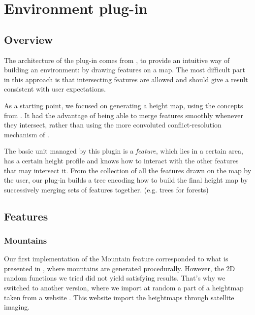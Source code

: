 \section{Environment plug-in}

\subsection{Overview}

The architecture of the plug-in comes from
\cite{DeclarativeArchitecture}, to provide an intuitive way of
building an environment: by drawing features on a map. The most
difficult part in this approach is that intersecting features are
allowed and should give a result consistent with user expectations.

As a starting point, we focused on generating a height map, using the
concepts from \cite{FeatureTree}. It had the advantage of being able
to merge features smoothly whenever they intersect, rather than using
the more convoluted conflict-resolution mechanism of
\cite{DeclarativeArchitecture}.

\bigskip

The basic unit managed by this plugin is a \emph{feature}, which lies
in a certain area, has a certain height profile and knows how to
interact with the other features that may intersect it. From the
collection of all the features drawn on the map by the user, our
plug-in builds a tree encoding how to build the final height map by
successively merging sets of features together.  %
(e.g. trees for forests)



\subsection{Features}

\subsubsection{Mountains}

Our first implementation of the Mountain feature corresponded to what
is presented in \cite{FeatureTree}, where mountains are generated
procedurally. However, the 2D random functions we tried did not yield
satisfying results. That's why we switched to another version, where
we import at random a part of a heightmap taken from a website
\cite{terrain-party}. This website import the heightmaps through
satellite imaging.

